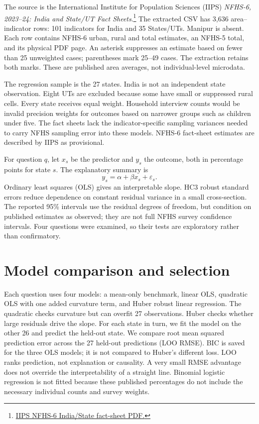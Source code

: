\documentclass[11pt,a4paper]{article}
\begin{document}
The source is the International Institute for Population Sciences (IIPS)
\emph{NFHS-6, 2023--24: India and State/UT Fact Sheets}.\footnote{\href{https://www.nfhsiips.in/nfhsuser/assets/National\%20Family\%20Health\%20Survey\%20\%28NFHS-6\%29\%202023-2024\%20Fact\%20Sheets.pdf}{IIPS NFHS-6 India/State fact-sheet PDF.}}
The extracted CSV has 3,636 area--indicator rows: 101 indicators for India
and 35 States/UTs. Manipur is absent. Each row contains NFHS-6 urban,
rural and total estimates, an NFHS-5 total, and its physical PDF page.
An asterisk suppresses an estimate based on fewer than 25 unweighted
cases; parentheses mark 25--49 cases. The extraction retains both marks.
These are published area averages, not individual-level microdata.

The regression sample is the 27 states. India is not an independent state
observation. Eight UTs are excluded because some have small or suppressed
rural cells. Every state receives equal weight. Household interview counts
would be invalid precision weights for outcomes based on narrower groups
such as children under five. The fact sheets lack the indicator-specific
sampling variances needed to carry NFHS sampling error into these models.
NFHS-6 fact-sheet estimates are described by IIPS as provisional.

For question $q$, let $x_s$ be the predictor and $y_s$ the outcome, both
in percentage points for state $s$. The explanatory summary is
\begin{equation}
y_s=\alpha+\beta x_s+\varepsilon_s.
\end{equation}
Ordinary least squares (OLS) gives an interpretable slope. HC3 robust
standard errors reduce dependence on constant residual variance in a
small cross-section. The reported 95\% intervals use the residual
degrees of freedom, but condition on published estimates as observed;
they are not full NFHS survey confidence intervals. Four questions were
examined, so their tests are exploratory rather than confirmatory.

\section{Model comparison and selection}

Each question uses four models: a mean-only benchmark, linear OLS,
quadratic OLS with one added curvature term, and Huber robust linear
regression. The quadratic checks curvature but
can overfit 27 observations. Huber checks whether large residuals drive
the slope. For each state in turn, we fit the model on the other 26 and
predict the held-out state. We compare root mean squared prediction
error across the 27 held-out predictions (LOO RMSE). BIC is saved for the
three OLS models; it is not compared to Huber's different loss.
LOO ranks prediction, not explanation or causality. A very small RMSE
advantage does not override the interpretability of a straight line.
Binomial logistic regression is not fitted because these published
percentages do not include the necessary individual counts and survey
weights.
\end{document}
